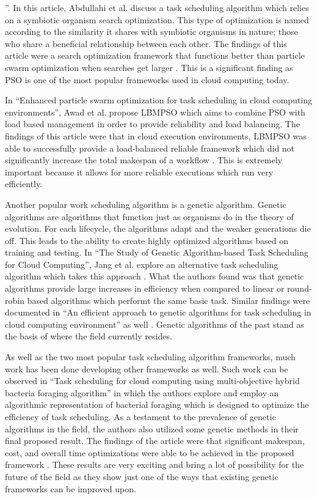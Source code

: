 \documentclass[fleqn,10pt]{SelfArx} %
\begin{document}
”. In this article, Abdullahi et al. discuss a task scheduling algorithm which relies on a symbiotic organism search optimization. This type of optimization is named according to the similarity it shares with symbiotic organisms in nature; those who share a beneficial relationship between each other. The findings of this article were a search optimization framework that functions better than particle swarm optimization when searches get larger \cite{abdullahi2016symbiotic}. This is a significant finding as PSO is one of the most popular frameworks used in cloud computing today.

In “Enhanced particle swarm optimization for task scheduling in cloud computing environments”, Awad et al. propose LBMPSO which aims to combine PSO with load based management in order to provide reliability and load balancing. The findings of this article were that in cloud execution environments, LBMPSO was able to successfully provide a load-balanced reliable framework which did not significantly increase the total makespan of a workflow \cite{awad2015enhanced}. This is extremely important because it allows for more reliable executions which run very efficiently.

Another popular work scheduling algorithm is a genetic algorithm. Genetic algorithms are algorithms that function just as organisms do in the theory of evolution. For each lifecycle, the algorithms adapt and the weaker generations die off. This leads to the ability to create highly optimized algorithms based on training and testing. In “The Study of Genetic Algorithm-based Task Scheduling for Cloud Computing”, Jang et al. explore an alternative task scheduling algorithm which takes this approach \cite{jang2012study}. What the authors found was that genetic algorithms provide large increases in efficiency when compared to linear or round-robin based algorithms which performt the same basic task. Similar findings were documented in “An efficient approach to genetic algorithms for task scheduling in cloud computing environment” as well \cite{kaur2012efficient}. Genetic algorithms of the past stand as the basis of where the field currently resides.

As well as the two most popular task scheduling algorithm frameworks, much work has been done developing other frameworks as well. Such work can be observed in “Task scheduling for cloud computing using multi-objective hybrid bacteria foraging algorithm” in which the authors explore and employ an algorithmic representation of bacterial foraging which is designed to optimize the efficiency of task scheduling. As a testament to the prevalence of genetic algorithms in the field, the authors also utilized some genetic methods in their final proposed result. The findings of the article were that significant makespan, cost, and overall time optimizations were able to be achieved in the proposed framework \cite{srichandan2018task}. These results are very exciting and bring a lot of possibility for the future of the field as they show just one of the ways that existing genetic frameworks can be improved upon.
\end{document}
